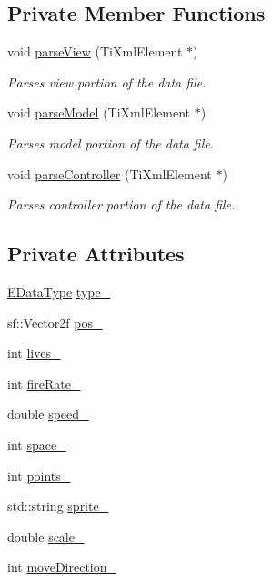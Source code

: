 \subsection*{\-Private \-Member \-Functions}
\begin{DoxyCompactItemize}
\item 
void \hyperlink{classfactories_1_1DataParser_aff4d87532fb4ea2cc3d6166bf1d6934f}{parse\-View} (\-Ti\-Xml\-Element $\ast$)
\begin{DoxyCompactList}\small\item\em \-Parses view portion of the data file. \end{DoxyCompactList}\item 
void \hyperlink{classfactories_1_1DataParser_ae362aee1c8a1a248fd8129b506cb72bf}{parse\-Model} (\-Ti\-Xml\-Element $\ast$)
\begin{DoxyCompactList}\small\item\em \-Parses model portion of the data file. \end{DoxyCompactList}\item 
void \hyperlink{classfactories_1_1DataParser_aeeb7f4731dd6c48feac275d54dc2808b}{parse\-Controller} (\-Ti\-Xml\-Element $\ast$)
\begin{DoxyCompactList}\small\item\em \-Parses controller portion of the data file. \end{DoxyCompactList}\end{DoxyCompactItemize}
\subsection*{\-Private \-Attributes}
\begin{DoxyCompactItemize}
\item 
\hyperlink{namespacefactories_ab925b318a5bc89d3bc8a7e3fdc364023}{\-E\-Data\-Type} \hyperlink{classfactories_1_1DataParser_a689111b4c6ee7488a62c3fb1ff89cd5d}{type\-\_\-}
\item 
sf\-::\-Vector2f \hyperlink{classfactories_1_1DataParser_a17196c20323b1bbba5fa757ba3410ce9}{pos\-\_\-}
\item 
int \hyperlink{classfactories_1_1DataParser_ae04c212ba61b90896985daecb19461fa}{lives\-\_\-}
\item 
int \hyperlink{classfactories_1_1DataParser_afe2e18bbfd11122f94fe4d8b06a9e87c}{fire\-Rate\-\_\-}
\item 
double \hyperlink{classfactories_1_1DataParser_a97b951f150540316e0c279beefe40a1b}{speed\-\_\-}
\item 
int \hyperlink{classfactories_1_1DataParser_ac8b695251d0e8259a2b0143efc133438}{space\-\_\-}
\item 
int \hyperlink{classfactories_1_1DataParser_a32f00f55f35b1d564d66e6465b6b8e11}{points\-\_\-}
\item 
std\-::string \hyperlink{classfactories_1_1DataParser_a5cca04bb7449e4801c349c7432491d10}{sprite\-\_\-}
\item 
double \hyperlink{classfactories_1_1DataParser_ae71e4885db9d3e59d16f102169b21e05}{scale\-\_\-}
\item 
int \hyperlink{classfactories_1_1DataParser_a20d5f4c18a9d02ce373908ae3bc6e7b4}{move\-Direction\-\_\-}
\end{DoxyCompactItemize}


